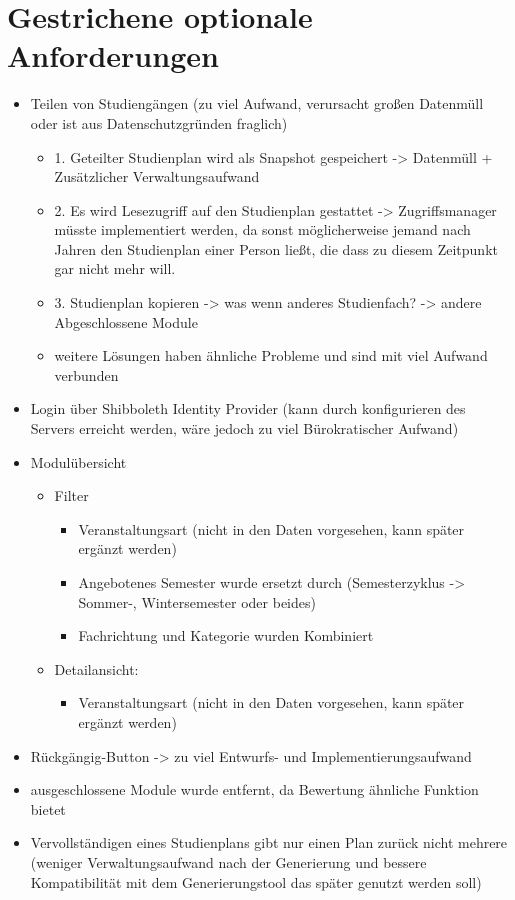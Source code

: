 \section{Gestrichene optionale Anforderungen}
\begin{itemize}
	\item Teilen von Studiengängen (zu viel Aufwand, verursacht großen Datenmüll oder ist aus Datenschutzgründen fraglich)
		\begin{itemize}
			\item 1. Geteilter Studienplan wird als Snapshot gespeichert -> Datenmüll + Zusätzlicher Verwaltungsaufwand
			\item 2. Es wird Lesezugriff auf den Studienplan gestattet -> Zugriffsmanager müsste implementiert werden, da sonst möglicherweise jemand nach Jahren den Studienplan einer Person ließt, die dass zu diesem Zeitpunkt gar nicht mehr will.
			\item 3. Studienplan kopieren -> was wenn anderes Studienfach? -> andere Abgeschlossene Module
			\item weitere Lösungen haben ähnliche Probleme und sind mit viel Aufwand verbunden
		\end{itemize}	
	\item Login über Shibboleth Identity Provider (kann durch konfigurieren des Servers erreicht werden, wäre jedoch zu viel Bürokratischer Aufwand)
	\item Modulübersicht
		\begin{itemize}
			\item Filter
				\begin{itemize}
					\item Veranstaltungsart (nicht in den Daten vorgesehen, kann später ergänzt werden)
					\item Angebotenes Semester wurde ersetzt durch (Semesterzyklus -> Sommer-, Wintersemester oder beides)
					\item Fachrichtung und Kategorie wurden Kombiniert
				\end{itemize}
			\item Detailansicht:
				\begin{itemize}
					\item Veranstaltungsart (nicht in den Daten vorgesehen, kann später ergänzt werden)
				\end{itemize}
		\end{itemize}
	\item Rückgängig-Button -> zu viel Entwurfs- und Implementierungsaufwand
	\item ausgeschlossene Module wurde entfernt, da Bewertung ähnliche Funktion bietet
	\item Vervollständigen eines Studienplans gibt nur einen Plan zurück nicht mehrere (weniger Verwaltungsaufwand nach der Generierung und bessere Kompatibilität mit dem Generierungstool das später genutzt werden soll)
\end{itemize}